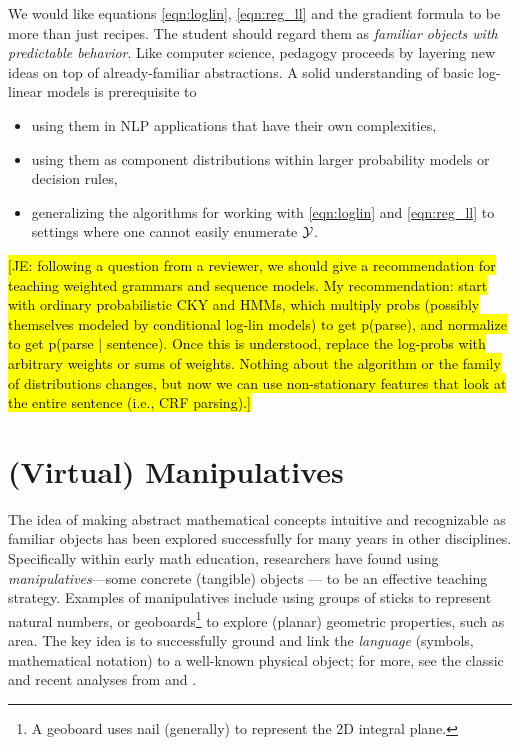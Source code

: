 \documentclass[11pt,letterpaper]{article}
\newcommand{\Note}[1]{}
\renewcommand{\Note}[1]{\hl{[#1]}}  %
\newcommand{\NoteSigned}[3]{{\sethlcolor{#2}\Note{#1: #3}}}
\newcommand{\NoteJE}[1]{\NoteSigned{JE}{LightGreen}{#1}}
\begin{document}
We would like equations \eqref{eqn:loglin}, \eqref{eqn:reg_ll} and the
gradient formula to be more than just recipes.  The student should
regard them as {\em familiar objects with predictable behavior}.  Like
computer science, pedagogy proceeds by layering new ideas on top of
already-familiar abstractions.  A solid understanding of basic
log-linear models is prerequisite to 
\begin{itemize}
\item using them in NLP applications that have their own complexities, 
\item using them as component distributions within larger probability
  models or decision rules,
\item generalizing the algorithms for working with \eqref{eqn:loglin}
  and \eqref{eqn:reg_ll} to settings where one cannot easily enumerate
  ${\cal Y}$.
\end{itemize}

\NoteJE{following a question from a reviewer, we should give a
  recommendation for teaching weighted grammars and sequence models.
  My recommendation: start with ordinary probabilistic CKY and HMMs,
  which multiply probs (possibly themselves modeled by conditional
  log-lin models) to get p(parse), and normalize to get p(parse |
  sentence).  Once this is understood, replace the log-probs with
  arbitrary weights or sums of weights.  Nothing about the algorithm
  or the family of distributions changes, but now we can use
  non-stationary features that look at the entire sentence (i.e., CRF
  parsing).}
  
\section{(Virtual) Manipulatives}
The idea of making abstract mathematical concepts intuitive and recognizable as familiar objects 
has been explored successfully for many years in other disciplines. Specifically within early 
math education, researchers have found using \textit{manipulatives}---some concrete (tangible) 
objects --- to be an effective teaching strategy. Examples of manipulatives include using groups of 
sticks to represent natural numbers, or geoboards\footnote{A geoboard uses nail (generally) to represent 
the 2D integral plane.} to explore (planar) geometric properties, such as area. The key idea is to 
successfully ground and link the \textit{language} (symbols, mathematical notation) to a well-known physical 
object; for more, see the classic and recent analyses from
 and .
\end{document}
